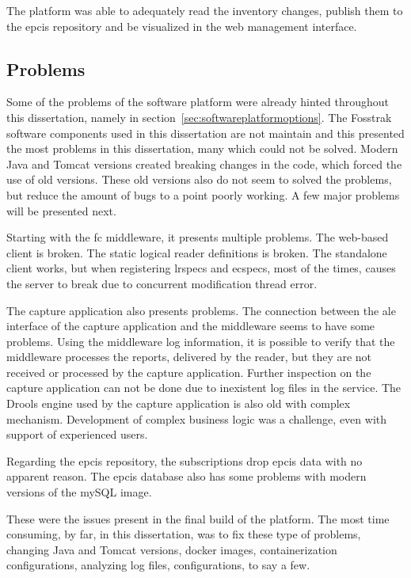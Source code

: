 The platform was able to adequately read the inventory changes, publish them to the \ac{epcis} repository and be visualized in the web management interface.

\subsection{Problems}

Some of the problems of the software platform were already hinted throughout this dissertation, namely in section~\ref{sec:softwareplatformoptions}.
The Fosstrak software components used in this dissertation are not maintain and this presented the most problems in this dissertation, many which could not be solved.
Modern Java and Tomcat versions created breaking changes in the code, which forced the use of old versions. 
These old versions also do not seem to solved the problems, but reduce the amount of bugs to a point poorly working. A few major problems will be presented next.

Starting with the \ac{fc} middleware, it presents multiple problems. 
The web-based client is broken. The static logical reader definitions is broken.
The standalone client works, but when registering \acp{lrspec} and \acp{ecspec}, most of the times, causes the server to break due to concurrent modification thread error. 

The capture application also presents problems.
The connection between the \ac{ale} interface of the capture application and the middleware seems to have some problems. Using the middleware log information, it is possible to verify that the middleware processes the reports, delivered by the reader, but they are not received or processed by the capture application.
Further inspection on the capture application can not be done due to inexistent log files in the service.
The Drools engine used by the capture application is also old with complex mechanism. Development of complex business logic was a challenge, even with support of experienced users.

Regarding the \ac{epcis} repository, the subscriptions drop \ac{epcis} data with no apparent reason. The \ac{epcis} database also has some problems with modern versions of the mySQL image.

These were the issues present in the final build of the platform. The most time consuming, by far, in this dissertation, was to fix these type of problems, changing Java and Tomcat versions, docker images, containerization configurations, analyzing log files, configurations, to say a few.